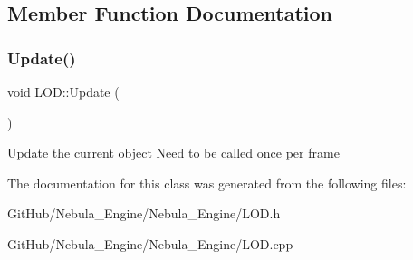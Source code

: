 \subsection{Member Function Documentation}
\mbox{\label{class_l_o_d_a624f5f007658c5a1a65dace8e40ab6ab}} 
\subsubsection{\texorpdfstring{Update()}{Update()}}
{\footnotesize\ttfamily void L\+O\+D\+::\+Update (\begin{DoxyParamCaption}{ }\end{DoxyParamCaption})}

Update the current object Need to be called once per frame 

The documentation for this class was generated from the following files\+:\begin{DoxyCompactItemize}
\item 
Git\+Hub/\+Nebula\+\_\+\+Engine/\+Nebula\+\_\+\+Engine/L\+O\+D.\+h\item 
Git\+Hub/\+Nebula\+\_\+\+Engine/\+Nebula\+\_\+\+Engine/L\+O\+D.\+cpp\end{DoxyCompactItemize}
